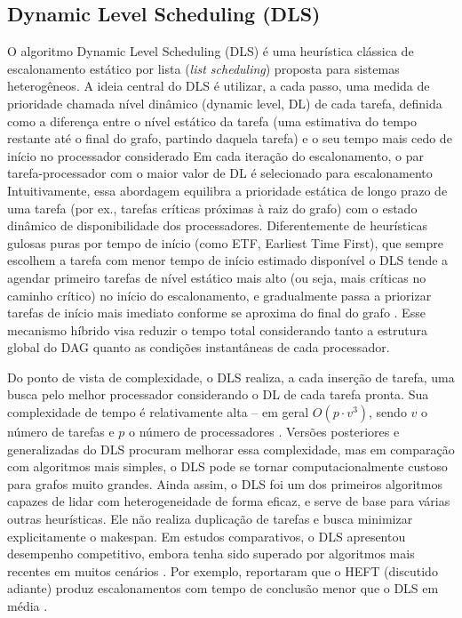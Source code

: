 \documentclass[12pt, %
openright, 
oneside, %
a4paper,    %
brazil]{facom-ufu-abntex2}
\begin{document}
\subsection{Dynamic Level Scheduling (DLS)} 
O algoritmo Dynamic Level Scheduling (DLS) é uma heurística clássica de escalonamento estático por lista (\textit{list scheduling}) proposta para sistemas heterogêneos. A ideia central do DLS é utilizar, a cada passo, uma medida de prioridade chamada nível dinâmico (dynamic level, DL) de cada tarefa, definida como a diferença entre o nível estático da tarefa (uma estimativa do tempo restante até o final do grafo, partindo daquela tarefa) e o seu tempo mais cedo de início no processador considerado \cite{hagras2003static} Em cada iteração do escalonamento, o par tarefa-processador com o maior valor de DL é selecionado para escalonamento \cite{hagras2003static}  Intuitivamente, essa abordagem equilibra a prioridade estática de longo prazo de uma tarefa (por ex., tarefas críticas próximas à raiz do grafo) com o estado dinâmico de disponibilidade dos processadores. Diferentemente de heurísticas gulosas puras por tempo de início (como ETF, Earliest Time First), que sempre escolhem a tarefa com menor tempo de início estimado disponível \cite{hagras2003static}  o DLS tende a agendar primeiro tarefas de nível estático mais alto (ou seja, mais críticas no caminho crítico) no início do escalonamento, e gradualmente passa a priorizar tarefas de início mais imediato conforme se aproxima do final do grafo \cite{hagras2003static}. Esse mecanismo híbrido visa reduzir o tempo total considerando tanto a estrutura global do DAG quanto as condições instantâneas de cada processador.

Do ponto de vista de complexidade, o DLS realiza, a cada inserção de tarefa, uma busca pelo melhor processador considerando o DL de cada tarefa pronta. Sua complexidade de tempo é relativamente alta – em geral $O(p \cdot v^3)$, sendo $v$ o número de tarefas e $p$ o número de processadores \cite{hagras2003static}.  Versões posteriores e generalizadas do DLS procuram melhorar essa complexidade, mas em comparação com algoritmos mais simples, o DLS pode se tornar computacionalmente custoso para grafos muito grandes. Ainda assim, o DLS foi um dos primeiros algoritmos capazes de lidar com heterogeneidade de forma eficaz, e serve de base para várias outras heurísticas. Ele não realiza duplicação de tarefas e busca minimizar explicitamente o makespan. Em estudos comparativos, o DLS apresentou desempenho competitivo, embora tenha sido superado por algoritmos mais recentes em muitos cenários \cite{baskiyar2005scheduling}.  Por exemplo, \cite{topcuoglu2002performance}  reportaram que o HEFT (discutido adiante) produz escalonamentos com tempo de conclusão menor que o DLS em média \cite{baskiyar2005scheduling}.
\end{document}
